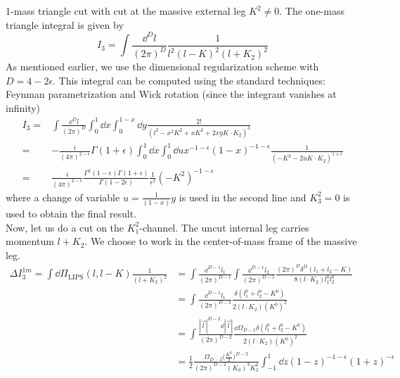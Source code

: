 1-mass triangle cut with cut at the massive external leg $K^2 \neq 0$.
The one-mass triangle integral is given by 
\begin{equation*}
I_3 = \int\frac{\dd^D l }{(2\pi)^D}\frac{1}{l^2(l-K)^2(l+K_2)^2}
\end{equation*}
As mentioned earlier, we use the dimensional regularization scheme with $D = 4-2\epsilon$.
This integral can be computed using the standard techniques: Feynman parametrization and Wick rotation (since the integrant vanishes at infinity)
\begin{equation*}
\begin{split}
I_3 = & \int\frac{\dd^D l }{(2\pi)^D}\int_0^{1} \dd x \int_0^{1-x}\dd y \frac{2!}{(l^2 - x^2 K^2 + xK^2 + 2xy K\cdot K_2)^3}
\\
= &
-\frac{i}{(4\pi)^{2-\epsilon}}\Gamma (1+\epsilon)
\int^1_0 \dd x\int_0^1 \dd u x^{-1-\epsilon} (1-x)^{-1-\epsilon}
\frac{1}{(-K^2 - 2uK\cdot K_2)^{1+\epsilon}}
\\
= &
\frac{i}{(4\pi)^{2-\epsilon}}\frac{\Gamma^2(1-\epsilon)\Gamma(1+\epsilon)}{\Gamma(1-2\epsilon)}
\frac{1}{\epsilon^2}(-K^2)^{-1-\epsilon}
\end{split}
\end{equation*}
where a change of variable $u =\frac{1}{(1-x)}y$ is used in the second line and $K_3^2 = 0$ is used to obtain the final result.
\\
Now, let us do a cut on the $K_1^2$-channel. 
The uncut internal leg carries momentum $l + K_2$. 
We choose to work in the center-of-mass frame of the massive leg.
%
\begin{equation*}
\begin{split}
\Delta I_3^{1m} = \int\dd \Pi_{\textrm{LIPS}}(l, l-K) \frac{1}{(l+K_2)^2} & =
\int\frac{\dd^{D-1}l_1}{(2\pi)^{D-1}}\int\frac{\dd^{D-1}l_2}{(2\pi)^{D-1}}
\frac{(2\pi)^{D}\delta^{D}(l_1 + l_2 - K)}{8(l\cdot K_2)l_1^0 l_2^0}
\\
& = \int\frac{\dd^{D-1}l_1}{(2\pi)^{D-2}}\frac{\delta(l_1^0 + l_2^0 - K^0)}{2(l\cdot K_2)(K^0)^2} 
\\
& = \int\frac{|\vec{l}|^{D-2}\dd |\vec{l}|}{(2\pi)^{D-2}} \frac{\dd\Omega_{D-1}\delta(l_1^0 + l_2^0 - K^0)}{2 ( l \cdot K_2)(K^0)^2}
\\
& = \frac{1}{2}\frac{\Omega_{D-2}\big(\frac{K^0}{2}\big)^{D-2}}{(2\pi)^{D-2}(K_0)^3 K^0_2} \int_{-1}^1\dd z (1-z)^{-1-\epsilon}(1+z)^{-\epsilon}
\end{split} 
\end{equation*}
